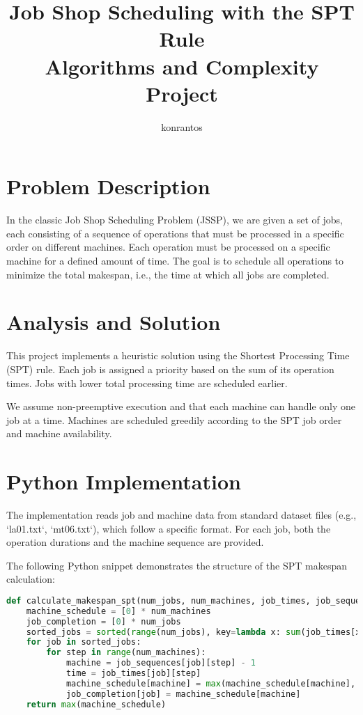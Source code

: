 \documentclass[12pt]{article}
\title{Job Shop Scheduling with the SPT Rule \\ \large Algorithms and Complexity Project}
\author{konrantos}
\date{}
\begin{document}
\maketitle

\section{Problem Description}

In the classic Job Shop Scheduling Problem (JSSP), we are given a set of jobs, each consisting of a sequence of operations that must be processed in a specific order on different machines. Each operation must be processed on a specific machine for a defined amount of time. The goal is to schedule all operations to minimize the total makespan, i.e., the time at which all jobs are completed.

\section{Analysis and Solution}

This project implements a heuristic solution using the Shortest Processing Time (SPT) rule. Each job is assigned a priority based on the sum of its operation times. Jobs with lower total processing time are scheduled earlier.

We assume non-preemptive execution and that each machine can handle only one job at a time. Machines are scheduled greedily according to the SPT job order and machine availability.

\section{Python Implementation}

The implementation reads job and machine data from standard dataset files (e.g., `la01.txt`, `mt06.txt`), which follow a specific format. For each job, both the operation durations and the machine sequence are provided.

The following Python snippet demonstrates the structure of the SPT makespan calculation:

\begin{lstlisting}[language=Python, caption=SPT-based makespan calculation]
def calculate_makespan_spt(num_jobs, num_machines, job_times, job_sequences):
    machine_schedule = [0] * num_machines
    job_completion = [0] * num_jobs
    sorted_jobs = sorted(range(num_jobs), key=lambda x: sum(job_times[x]))
    for job in sorted_jobs:
        for step in range(num_machines):
            machine = job_sequences[job][step] - 1
            time = job_times[job][step]
            machine_schedule[machine] = max(machine_schedule[machine], job_completion[job]) + time
            job_completion[job] = machine_schedule[machine]
    return max(machine_schedule)
\end{lstlisting}
\end{document}
